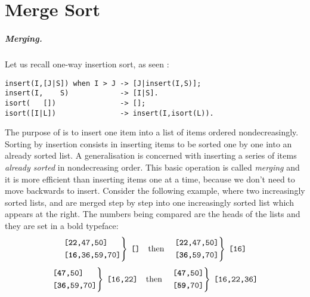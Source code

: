 
\chapter{Merge Sort}

\paragraph{Merging.}

Let us recall one\hyp{}way insertion sort, as seen
:
\begin{verbatim}
insert(I,[J|S]) when I > J -> [J|insert(I,S)];
insert(I,    S)            -> [I|S].
isort(   [])               -> [];
isort([I|L])               -> insert(I,isort(L)).
\end{verbatim}
The purpose of  is to insert one item into a list of
items ordered nondecreasingly. Sorting by insertion consists in
inserting items to be sorted one by one into an already sorted list. A
generalisation is concerned with inserting a series of items
\emph{already sorted} in nondecreasing order. This basic operation is
called \emph{merging} and it is more efficient than inserting items
one at a time, because we don't need to move backwards to
insert. Consider the following example, where two increasingly sorted
lists, \erlcode{[22,47,50]} and \erlcode{[16,36,59,70]} are merged
step by step into one increasingly sorted list which appears at the
right. The numbers being compared are the heads of the lists and they
are set in a bold typeface:
\begin{equation*}
\left.
\begin{aligned}
&\texttt{[\textbf{22},47,50]}\\
&\texttt{[\textbf{16},36,59,70]}
\end{aligned}
\right\}
\;\texttt{[]}
\quad \text{then} \quad
\left.
\begin{aligned}
&\texttt{[\textbf{22},47,50]}\\
&\texttt{[\textbf{36},59,70]}
\end{aligned}
\right\}
\;\texttt{[16]}
\end{equation*}
\begin{equation*}
\left.
\begin{aligned}
&\texttt{[\textbf{47},50]}\\
&\texttt{[\textbf{36},59,70]}
\end{aligned}
\right\}
\;\texttt{[16,22]}
\quad \text{then} \quad
\left.
\begin{aligned}
&\texttt{[\textbf{47},50]}\\
&\texttt{[\textbf{59},70]}
\end{aligned}
\right\}
\;\texttt{[16,22,36]}
\end{equation*}
